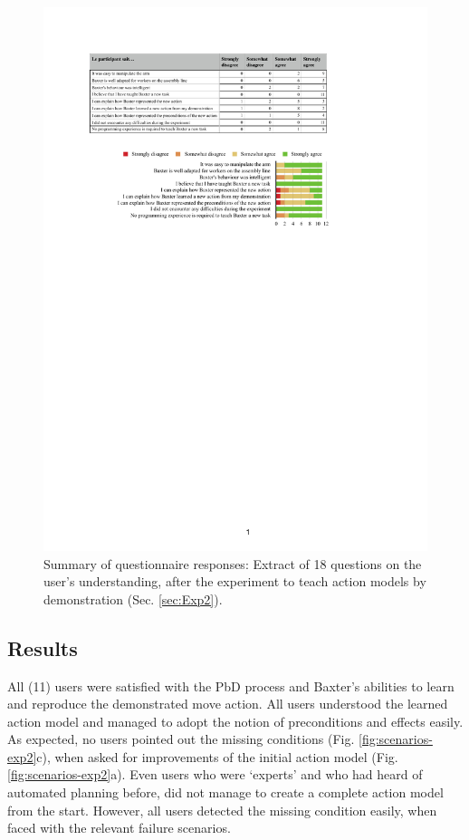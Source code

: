  \begin{figure}[ht]
  \centering
  \includegraphics[width=\linewidth]{figures/eEvaluation}
  \caption{Summary of questionnaire responses: Extract of 18 questions on the user's understanding, after the experiment to teach action models by demonstration (Sec. \ref{sec:Exp2}).}
  \label{fig:eEvaluation}
\end{figure}


\subsection{Results}
All (11) users were satisfied with the PbD process and Baxter's abilities to learn and reproduce the demonstrated move action. All users understood the learned action model and managed to adopt the notion of preconditions and effects easily. As expected, no users pointed out the missing conditions (Fig. \ref{fig:scenarios-exp2}c), when asked for improvements of the initial action model (Fig. \ref{fig:scenarios-exp2}a).
Even users who were `experts' and who had heard of automated planning before, did not manage to create a complete action model from the start. However, all users detected the missing condition easily, when faced with the relevant failure scenarios.

